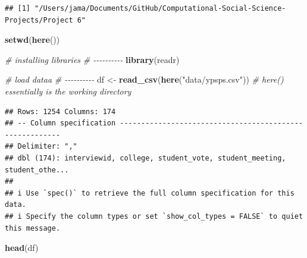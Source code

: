 \documentclass[
]{article}
\newenvironment{Shaded}{\begin{snugshade}}{\end{snugshade}}
\newcommand{\CommentTok}[1]{\textcolor[rgb]{0.56,0.35,0.01}{\textit{#1}}}
\newcommand{\FunctionTok}[1]{\textcolor[rgb]{0.13,0.29,0.53}{\textbf{#1}}}
\newcommand{\NormalTok}[1]{#1}
\newcommand{\OtherTok}[1]{\textcolor[rgb]{0.56,0.35,0.01}{#1}}
\newcommand{\StringTok}[1]{\textcolor[rgb]{0.31,0.60,0.02}{#1}}
\begin{document}
\begin{verbatim}
## [1] "/Users/jama/Documents/GitHub/Computational-Social-Science-Projects/Project 6"
\end{verbatim}

\begin{Shaded}
\begin{Highlighting}[]
\FunctionTok{setwd}\NormalTok{(}\FunctionTok{here}\NormalTok{())   }
\end{Highlighting}
\end{Shaded}

\begin{Shaded}
\begin{Highlighting}[]
\CommentTok{\# installing libraries }
\CommentTok{\# {-}{-}{-}{-}{-}{-}{-}{-}{-}{-}}
\FunctionTok{library}\NormalTok{(readr)}


\CommentTok{\# load dataa}
\CommentTok{\# {-}{-}{-}{-}{-}{-}{-}{-}{-}{-}}
\NormalTok{df }\OtherTok{\textless{}{-}} \FunctionTok{read\_csv}\NormalTok{(}\FunctionTok{here}\NormalTok{(}\StringTok{"data/ypsps.csv"}\NormalTok{)) }\CommentTok{\# here() essentially is the working directory}
\end{Highlighting}
\end{Shaded}

\begin{verbatim}
## Rows: 1254 Columns: 174
## -- Column specification --------------------------------------------------------
## Delimiter: ","
## dbl (174): interviewid, college, student_vote, student_meeting, student_othe...
## 
## i Use `spec()` to retrieve the full column specification for this data.
## i Specify the column types or set `show_col_types = FALSE` to quiet this message.
\end{verbatim}

\begin{Shaded}
\begin{Highlighting}[]
\FunctionTok{head}\NormalTok{(df)}
\end{Highlighting}
\end{Shaded}
\end{document}
